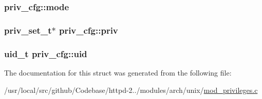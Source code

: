 \subsubsection[{\texorpdfstring{mode}{mode}}]{ priv\+\_\+cfg\+::mode}\hypertarget{structpriv__cfg_a364aacc1c74c16ef3a126c1855ef8d09}{}\label{structpriv__cfg_a364aacc1c74c16ef3a126c1855ef8d09}
\subsubsection[{\texorpdfstring{priv}{priv}}]{\setlength{\rightskip}{0pt plus 5cm}priv\+\_\+set\+\_\+t$\ast$ priv\+\_\+cfg\+::priv}\hypertarget{structpriv__cfg_a78b4feea0537e18a7b645f4a75e1a95b}{}\label{structpriv__cfg_a78b4feea0537e18a7b645f4a75e1a95b}
\subsubsection[{\texorpdfstring{uid}{uid}}]{\setlength{\rightskip}{0pt plus 5cm}uid\+\_\+t priv\+\_\+cfg\+::uid}\hypertarget{structpriv__cfg_a73fa44a599cf53883f0d41a192c31978}{}\label{structpriv__cfg_a73fa44a599cf53883f0d41a192c31978}


The documentation for this struct was generated from the following file\+:\begin{DoxyCompactItemize}
\item 
/usr/local/src/github/\+Codebase/httpd-\/2../modules/arch/unix/\hyperlink{mod__privileges_8c}{mod\+\_\+privileges.\+c}\end{DoxyCompactItemize}
